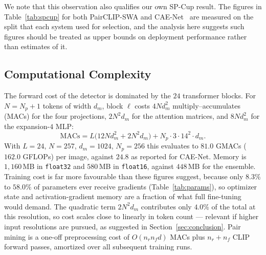 \documentclass[10pt,journal]{IEEEtran}
\begin{document}
We note that this observation also qualifies our own SP-Cup result. The
figures in Table~\ref{tab:spcup} for both PairCLIP-SWA and
CAE-Net~\cite{bhattacharjee2026caenet} are measured on the split that each
system used for selection, and the analysis here suggests such figures should
be treated as upper bounds on deployment performance rather than estimates of
it.

\subsection{Computational Complexity}
The forward cost of the detector is dominated by the $24$ transformer blocks.
For $N=N_p+1$ tokens of width $d_m$, block $\ell$ costs
$4Nd_m^2$ multiply--accumulates (MACs) for the four projections,
$2N^2d_m$ for the attention matrices, and $8Nd_m^2$ for the expansion-$4$ MLP:
\begin{equation}
\mathrm{MACs}=L\big(12Nd_m^2+2N^2d_m\big)+N_p\cdot 3\cdot 14^2\cdot d_m .
\label{eq:macs}
\end{equation}
With $L=24$, $N=257$, $d_m=1024$, $N_p=256$ this evaluates to
$81.0$ GMACs ($162.0$ GFLOPs) per image, against $24.8$ as reported for
CAE-Net. Memory is $1{,}160$\,MB in \texttt{float32} and $580$\,MB in
\texttt{float16}, against $448$\,MB for the ensemble. Training cost is far
more favourable than these figures suggest, because only $8.3\%$ to $58.0\%$
of parameters ever receive gradients (Table~\ref{tab:params}), so optimizer
state and activation-gradient memory are a fraction of what full fine-tuning
would demand. The quadratic term $2N^2d_m$ contributes only $4.0\%$ of the
total at this resolution, so cost scales close to linearly in token count ---
relevant if higher input resolutions are pursued, as suggested in
Section~\ref{sec:conclusion}. Pair mining is a one-off preprocessing cost of
$O(n_rn_fd)$ MACs plus $n_r+n_f$ CLIP forward passes, amortized over all
subsequent training runs.
\end{document}
